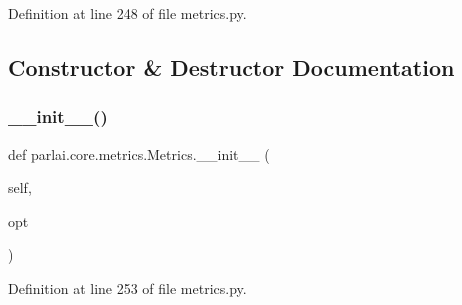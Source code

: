 Definition at line 248 of file metrics.\+py.



\subsection{Constructor \& Destructor Documentation}
\mbox{\label{classparlai_1_1core_1_1metrics_1_1Metrics_a58ecf4b635e97145e7cea37acac9f8d8}} 
\subsubsection{\texorpdfstring{\+\_\+\+\_\+init\+\_\+\+\_\+()}{\_\_init\_\_()}}
{\footnotesize\ttfamily def parlai.\+core.\+metrics.\+Metrics.\+\_\+\+\_\+init\+\_\+\+\_\+ (\begin{DoxyParamCaption}\item[{}]{self,  }\item[{}]{opt }\end{DoxyParamCaption})}



Definition at line 253 of file metrics.\+py.


